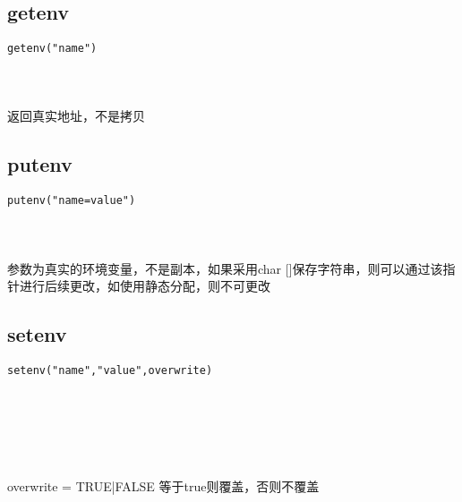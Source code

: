 \documentclass[10pt,a4paper]{article}
\begin{document}
\section{\color[rgb]{0.2,0.4,0.6}{环境}}
\subsection{getenv}
\begin{spacing}{2.0}
\lstset{language=C,numbers=none}
\begin{lstlisting}
getenv("name")
\end{lstlisting}
{\large\color[rgb]{0.2,0.4,0.6}{"name":}}
\paragraph{ \ \ }返回真实地址，不是拷贝
\end{spacing}

\subsection{putenv}
\begin{spacing}{2.0}
\lstset{language=C,numbers=none}
\begin{lstlisting}
putenv("name=value")
\end{lstlisting}
{\large\color[rgb]{0.2,0.4,0.6}{"name=value":}}
\paragraph{ \ \ }参数为真实的环境变量，不是副本，如果采用char []保存字符串，则可以通过该指针进行后续更改，如使用静态分配，则不可更改
\end{spacing}

\subsection{setenv}
\begin{spacing}{2.0}
\lstset{language=C,numbers=none}
\begin{lstlisting}
setenv("name","value",overwrite)
\end{lstlisting}
{\large\color[rgb]{0.2,0.4,0.6}{"name":}} \\
{\large\color[rgb]{0.2,0.4,0.6}{"value":}} \\
{\large\color[rgb]{0.2,0.4,0.6}{overwrite:}}
\paragraph{ \ \ }overwrite = TRUE|FALSE 等于true则覆盖，否则不覆盖
\end{spacing}
\end{document}
